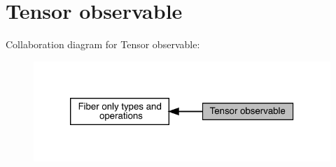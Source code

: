 \hypertarget{group__obstensor}{}\section{Tensor observable}
\label{group__obstensor}
Collaboration diagram for Tensor observable\+:\nopagebreak
\begin{figure}[H]
\begin{center}
\leavevmode
\includegraphics[width=320pt]{de/d87/group__obstensor}
\end{center}
\end{figure}
